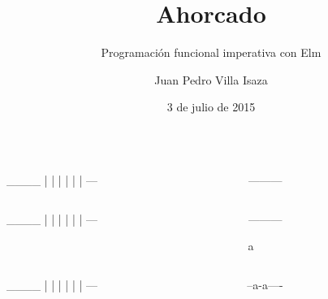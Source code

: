\documentclass[spanish]{beamer}
\title{Ahorcado}
\subtitle{Programación funcional imperativa con Elm}
\author{Juan Pedro Villa Isaza}
\institute{Stack Builders}
\date{3 de julio de 2015}
\begin{document}

\frame{\titlepage}


\begin{frame}[fragile]
  \begin{columns}[onlytextwidth,T]
    \begin{column}{.5\textwidth}
      \begin{code}
  ____
  |  |
  |
  |
  |
  |
 ---
      \end{code}
    \end{column}
    \begin{column}{.5\textwidth}
      \begin{code}


 ---------




      \end{code}
    \end{column}
  \end{columns}
\end{frame}


\begin{frame}[fragile]
  \begin{columns}[onlytextwidth,T]
    \begin{column}{.5\textwidth}
      \begin{code}
  ____
  |  |
  |
  |
  |
  |
 ---
      \end{code}
    \end{column}
    \begin{column}{.5\textwidth}
      \begin{code}


 ---------

 a


      \end{code}
    \end{column}
  \end{columns}
\end{frame}


\begin{frame}[fragile]
  \begin{columns}[onlytextwidth,T]
    \begin{column}{.5\textwidth}
      \begin{code}
  ____
  |  |
  |
  |
  |
  |
 ---
      \end{code}
    \end{column}
    \begin{column}{.5\textwidth}
      \begin{code}


 --a-a----




      \end{code}
    \end{column}
  \end{columns}
\end{frame}
\end{document}
